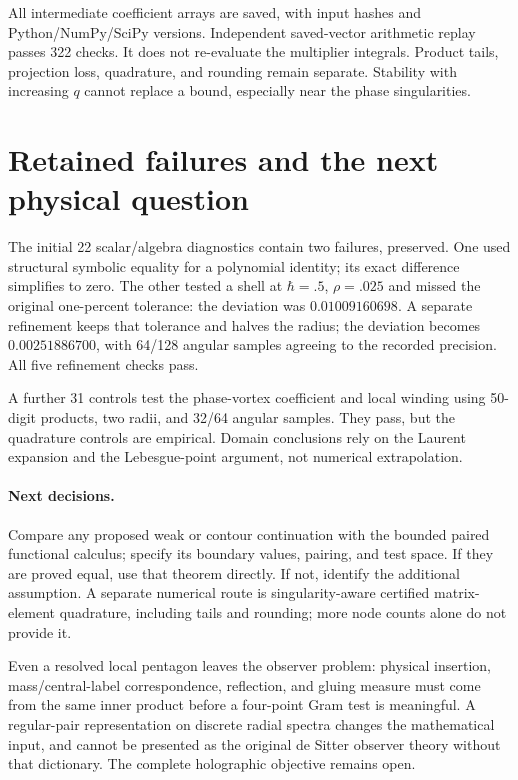 \documentclass[11pt,a4paper]{article}
\begin{document}
All intermediate coefficient arrays are saved, with input hashes and
Python/NumPy/SciPy versions. Independent saved-vector arithmetic replay
passes 322 checks. It does not re-evaluate the multiplier integrals.
Product tails, projection loss, quadrature, and rounding remain separate.
Stability with increasing $q$ cannot replace a bound, especially
near the phase singularities.

\newpage
\section{Retained failures and the next physical question}
The initial 22 scalar/algebra diagnostics contain two failures, preserved.
One used structural symbolic equality for a polynomial identity;
its exact difference simplifies to zero. The other tested a shell at
$\hbar=.5$, $\rho=.025$ and missed the original one-percent tolerance:
the deviation was $0.01009160698$.
A separate refinement keeps that tolerance and halves the radius;
the deviation becomes $0.00251886700$, with 64/128 angular samples
agreeing to the recorded precision. All five refinement checks pass.

A further 31 controls test the phase-vortex coefficient and local winding
using 50-digit products, two radii, and 32/64 angular samples.
They pass, but the quadrature controls are empirical.
Domain conclusions rely on the Laurent expansion and the
Lebesgue-point argument, not numerical extrapolation.

\paragraph{Next decisions.}
Compare any proposed weak or contour continuation with the bounded
paired functional calculus; specify its boundary values, pairing, and
test space. If they are proved equal, use that theorem directly.
If not, identify the additional assumption. A separate numerical route
is singularity-aware certified matrix-element quadrature,
including tails and rounding; more node counts alone do not provide it.

Even a resolved local pentagon leaves the observer problem:
physical insertion, mass/central-label correspondence, reflection,
and gluing measure must come from the same inner product before a
four-point Gram test is meaningful. A regular-pair representation on
discrete radial spectra changes the mathematical input, and cannot
be presented as the original de Sitter observer theory without that
dictionary. The complete holographic objective remains open.
\end{document}
